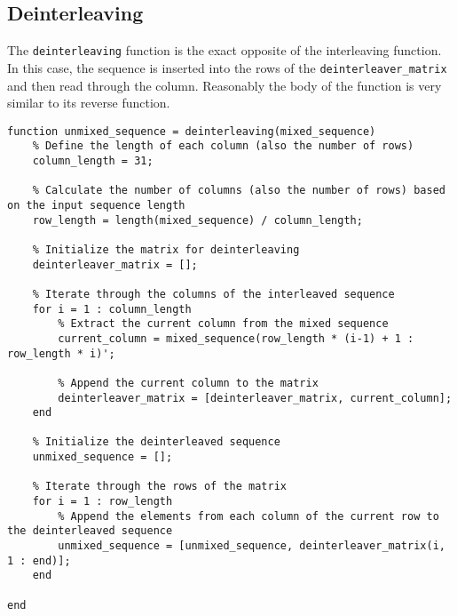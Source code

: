 \subsection{Deinterleaving}
The \texttt{deinterleaving} function is the exact opposite of the interleaving function. In this case, the sequence is inserted into the rows of the \texttt{deinterleaver\_matrix} and then read through the column. Reasonably the body of the function is very similar to its reverse function.

\begin{lstlisting}
function unmixed_sequence = deinterleaving(mixed_sequence)
    % Define the length of each column (also the number of rows)
    column_length = 31;

    % Calculate the number of columns (also the number of rows) based on the input sequence length
    row_length = length(mixed_sequence) / column_length;

    % Initialize the matrix for deinterleaving
    deinterleaver_matrix = [];

    % Iterate through the columns of the interleaved sequence
    for i = 1 : column_length
        % Extract the current column from the mixed sequence
        current_column = mixed_sequence(row_length * (i-1) + 1 : row_length * i)';
        
        % Append the current column to the matrix
        deinterleaver_matrix = [deinterleaver_matrix, current_column];
    end
    
    % Initialize the deinterleaved sequence
    unmixed_sequence = [];

    % Iterate through the rows of the matrix
    for i = 1 : row_length
        % Append the elements from each column of the current row to the deinterleaved sequence
        unmixed_sequence = [unmixed_sequence, deinterleaver_matrix(i, 1 : end)];
    end

end
\end{lstlisting}


